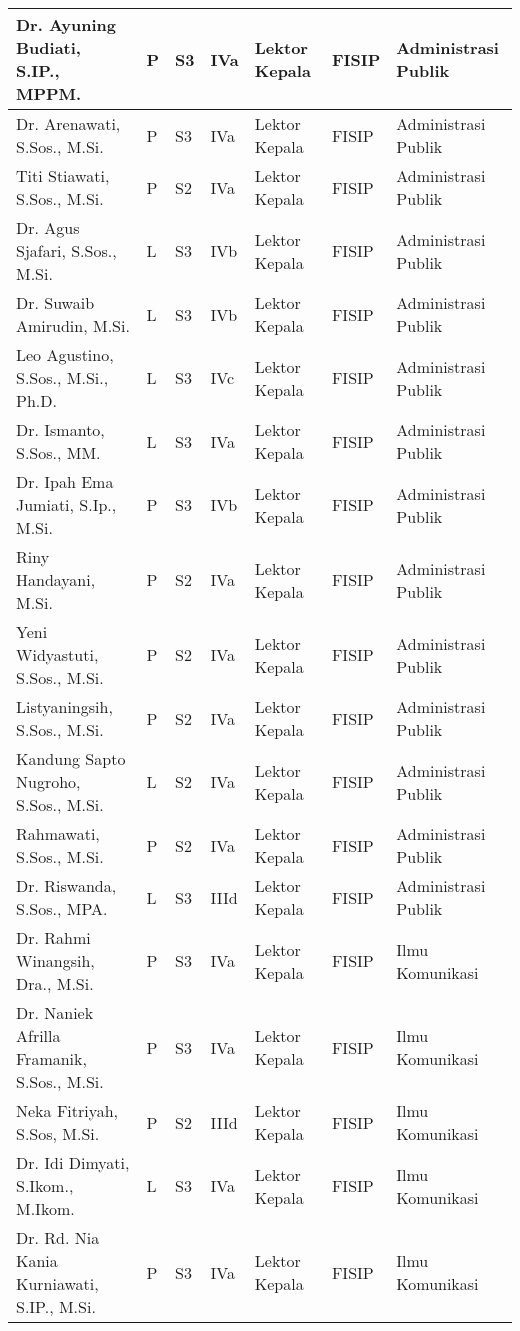 \documentclass[
]{book}
\begin{document}
\begin{longtable}{l|l|l|l|l|l|l}
\hline
Dr. Ayuning Budiati, S.IP., MPPM. & P & S3 & IVa & Lektor Kepala & FISIP & Administrasi Publik\\
\hline
Dr. Arenawati, S.Sos., M.Si. & P & S3 & IVa & Lektor Kepala & FISIP & Administrasi Publik\\
\hline
Titi Stiawati, S.Sos., M.Si. & P & S2 & IVa & Lektor Kepala & FISIP & Administrasi Publik\\
\hline
Dr. Agus Sjafari, S.Sos., M.Si. & L & S3 & IVb & Lektor Kepala & FISIP & Administrasi Publik\\
\hline
Dr. Suwaib Amirudin, M.Si. & L & S3 & IVb & Lektor Kepala & FISIP & Administrasi Publik\\
\hline
Leo Agustino, S.Sos., M.Si., Ph.D. & L & S3 & IVc & Lektor Kepala & FISIP & Administrasi Publik\\
\hline
Dr. Ismanto, S.Sos., MM. & L & S3 & IVa & Lektor Kepala & FISIP & Administrasi Publik\\
\hline
Dr. Ipah Ema Jumiati, S.Ip., M.Si. & P & S3 & IVb & Lektor Kepala & FISIP & Administrasi Publik\\
\hline
Riny Handayani, M.Si. & P & S2 & IVa & Lektor Kepala & FISIP & Administrasi Publik\\
\hline
Yeni Widyastuti, S.Sos., M.Si. & P & S2 & IVa & Lektor Kepala & FISIP & Administrasi Publik\\
\hline
Listyaningsih, S.Sos., M.Si. & P & S2 & IVa & Lektor Kepala & FISIP & Administrasi Publik\\
\hline
Kandung Sapto Nugroho, S.Sos., M.Si. & L & S2 & IVa & Lektor Kepala & FISIP & Administrasi Publik\\
\hline
Rahmawati, S.Sos., M.Si. & P & S2 & IVa & Lektor Kepala & FISIP & Administrasi Publik\\
\hline
Dr. Riswanda, S.Sos., MPA. & L & S3 & IIId & Lektor Kepala & FISIP & Administrasi Publik\\
\hline
Dr. Rahmi Winangsih, Dra., M.Si. & P & S3 & IVa & Lektor Kepala & FISIP & Ilmu Komunikasi\\
\hline
Dr. Naniek Afrilla Framanik, S.Sos., M.Si. & P & S3 & IVa & Lektor Kepala & FISIP & Ilmu Komunikasi\\
\hline
Neka Fitriyah, S.Sos, M.Si. & P & S2 & IIId & Lektor Kepala & FISIP & Ilmu Komunikasi\\
\hline
Dr. Idi Dimyati, S.Ikom., M.Ikom. & L & S3 & IVa & Lektor Kepala & FISIP & Ilmu Komunikasi\\
\hline
Dr. Rd. Nia Kania Kurniawati, S.IP., M.Si. & P & S3 & IVa & Lektor Kepala & FISIP & Ilmu Komunikasi\\

\end{longtable}
\end{document}
